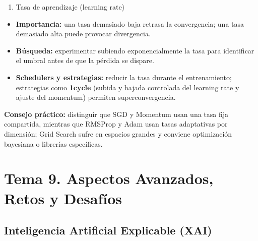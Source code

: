 \documentclass[12pt]{book} %
\providecommand{\tightlist}{%
  \setlength{\itemsep}{0pt}\setlength{\parskip}{0pt}}
\begin{document}
\begin{enumerate}
\def\labelenumi{\arabic{enumi}.}
\setcounter{enumi}{3}
\tightlist
\item
  Tasa de aprendizaje (learning rate)
\end{enumerate}

\begin{itemize}
\tightlist
\item
  \textbf{Importancia:} una tasa demasiado baja retrasa la convergencia;
  una tasa demasiado alta puede provocar divergencia.
\item
  \textbf{Búsqueda:} experimentar subiendo exponencialmente la tasa para
  identificar el umbral antes de que la pérdida se dispare.
\item
  \textbf{Schedulers y estrategias:} reducir la tasa durante el
  entrenamiento; estrategias como \textbf{1cycle} (subida y bajada
  controlada del learning rate y ajuste del momentum) permiten
  superconvergencia.
\end{itemize}

\textbf{Consejo práctico:} distinguir que SGD y Momentum usan una tasa
fija compartida, mientras que RMSProp y Adam usan tasas adaptativas por
dimensión; Grid Search sufre en espacios grandes y conviene optimización
bayesiana o librerías específicas.

\hypertarget{tema-9.-aspectos-avanzados-retos-y-desafuxedos}{%
\section{Tema 9. Aspectos Avanzados, Retos y
Desafíos}\label{tema-9.-aspectos-avanzados-retos-y-desafuxedos}}

\hypertarget{inteligencia-artificial-explicable-xai}{%
\subsection{Inteligencia Artificial Explicable
(XAI)}\label{inteligencia-artificial-explicable-xai}}
\end{document}
